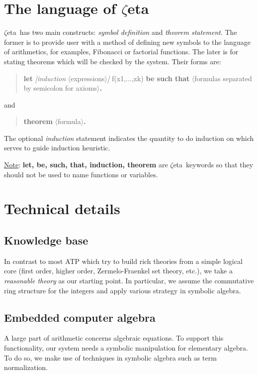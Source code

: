 \documentclass[12pt]{article}
\newcommand{\zetatp}{$\zeta$eta}
\begin{document}
\section{The language of \zetatp}

\zetatp\ has two main constructs: \emph{symbol definition} and \emph{theorem statement}. The former is to provide user with a method of defining new symbols to the language of arithmetics, for examples, Fibonacci or factorial functions. The later is for stating theorems which will be checked by the system. Their forms are:
\begin{quote}
{\bf let} {\it [induction} $\langle$expressions$\rangle${\it]} f(x1,...,xk) {\bf be such that} $\langle$formulas separated by semicolon for axioms$\rangle${\bf .}
\end{quote}
and
\begin{quote}
{\bf theorem} $\langle$formula$\rangle${\bf .}
\end{quote}
The optional {\it induction} statement indicates the quantity to do induction on which serves to guide induction heuristic.

\underline{Note}: \textbf{let, be, such, that, induction, theorem} are \zetatp\ keywords so that they should not be used to name functions or variables.

\section{Technical details}

\subsection{Knowledge base}

In contrast to most ATP which try to build rich theories from a simple logical core (first order, higher order, Zermelo-Fraenkel set theory, etc.), we take a \emph{reasonable theory} as our starting point. In particular, we assume the commutative ring structure for the integers and apply various strategy in symbolic algebra.

\subsection{Embedded computer algebra}

A large part of arithmetic concerns algebraic equations. To support this functionality, our system needs a symbolic manipulation for elementary algebra. To do so, we make use of techniques in symbolic algebra such as term normalization.
\end{document}
